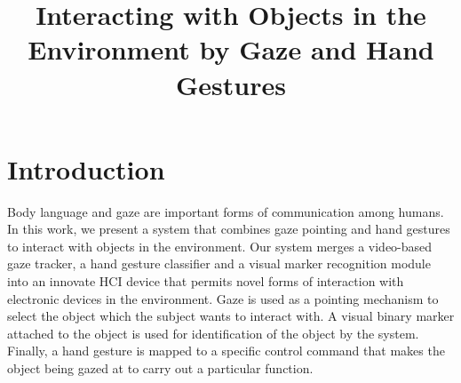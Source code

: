 \documentclass[jou,a4paper,notxfonts]{apa}
\title{Interacting with Objects in the Environment by Gaze and Hand Gestures}
\begin{document}
\maketitle

\thispagestyle{plain}

\section{Introduction} 
Body language and gaze are important forms of communication among humans. In this work, we present a system that
combines gaze pointing and hand gestures to interact with objects in the environment. Our system merges a video-based gaze
tracker, a hand gesture classifier and a visual marker recognition module into an innovate HCI device that permits novel
forms of interaction with electronic devices in the environment. Gaze is used as a pointing mechanism to select the
object which the subject wants to interact with. A visual binary marker attached to the object is used for
identification of the object by the system. Finally, a hand gesture is mapped to a specific control command that makes
the object being gazed at to carry out a particular function.
\end{document}
